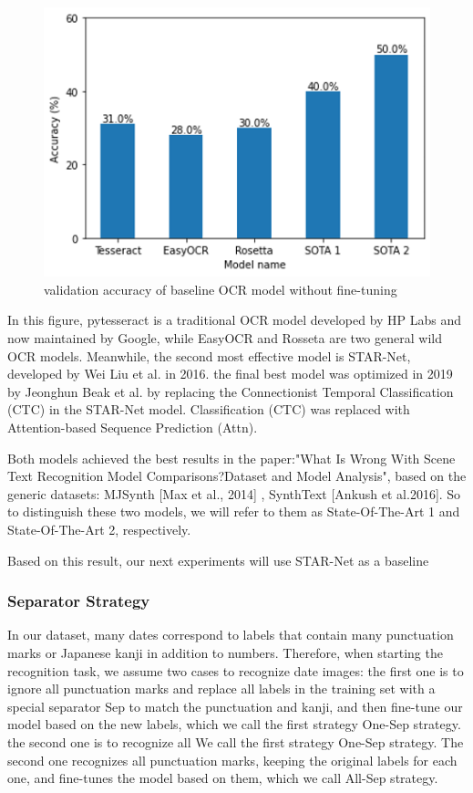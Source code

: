 \documentclass{article}
\begin{document}
\begin{figure}[ht] \centering
	\label{baseline model}     
	\includegraphics[width=0.8\columnwidth]{baseline model.png}  
	\caption{validation accuracy of baseline OCR model without fine-tuning}
\end{figure}

In this figure, pytesseract is a traditional OCR model developed by HP Labs and now maintained by Google, while EasyOCR and Rosseta are two general wild OCR models. Meanwhile, the second most effective model is STAR-Net, developed by Wei Liu et al. in 2016. the final best model was optimized in 2019 by Jeonghun Beak et al. by replacing the Connectionist Temporal Classification (CTC) in the STAR-Net model. Classification (CTC) was replaced with Attention-based Sequence Prediction (Attn).

Both models achieved the best results in the paper:"What Is Wrong With Scene Text Recognition Model Comparisons?Dataset and Model Analysis", based on the generic datasets: MJSynth [Max et al., 2014] , SynthText [Ankush et al.2016]. So to distinguish these two models, we will refer to them as State-Of-The-Art 1 and State-Of-The-Art 2, respectively.

Based on this result, our next experiments will use STAR-Net as a baseline

\subsubsection{Separator Strategy}

In our dataset, many dates correspond to labels that contain many punctuation marks or Japanese kanji in addition to numbers. Therefore, when starting the recognition task, we assume two cases to recognize date images: the first one is to ignore all punctuation marks and replace all labels in the training set with a special separator Sep to match the punctuation and kanji, and then fine-tune our model based on the new labels, which we call the first strategy One-Sep strategy. the second one is to recognize all We call the first strategy One-Sep strategy. The second one recognizes all punctuation marks, keeping the original labels for each one, and fine-tunes the model based on them, which we call All-Sep strategy.
\end{document}
